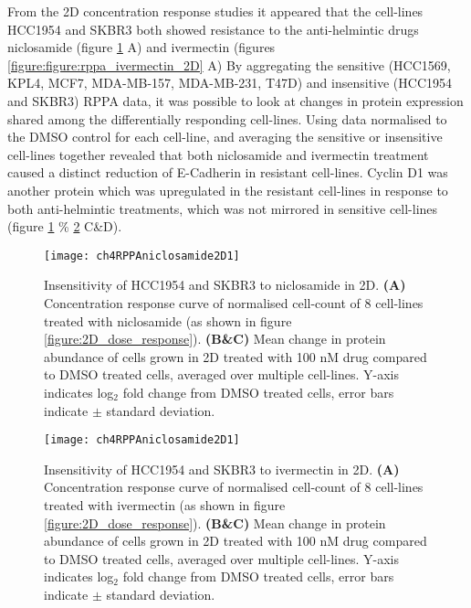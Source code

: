 \documentclass[a4paper,11pt,twoside,openright]{scrbook}
\begin{document}
From the 2D concentration response studies it appeared that the cell-lines HCC1954 and SKBR3 both showed resistance to 
the anti-helmintic drugs niclosamide (figure \ref{figure:rppa_niclosamide_2D1} A) and ivermectin (figures 
\ref{figure:figure:rppa_ivermectin_2D} A)
By aggregating the sensitive (HCC1569, KPL4, MCF7, MDA-MB-157, MDA-MB-231, T47D) and insensitive (HCC1954 and SKBR3) 
RPPA data, it was possible to look at changes in protein expression shared among the differentially responding 
cell-lines.
Using data normalised to the DMSO control for each cell-line, and averaging the sensitive or insensitive cell-lines 
together revealed that both niclosamide and ivermectin treatment caused a distinct reduction of E-Cadherin in resistant 
cell-lines.
Cyclin D1 was another protein which was upregulated in the resistant cell-lines in response to both anti-helmintic 
treatments, which was not mirrored in sensitive cell-lines (figure \ref{figure:rppa_niclosamide_2D1} \% 
\ref{figure:rppa_ivermectin_2D} C\&D).


\begin{figure}
    \captionsetup{width=0.8\textwidth}
    \caption[Insensitivity of HCC1954 and SKBR3 to niclosamide in 2D]{
        Insensitivity of HCC1954 and SKBR3 to niclosamide in 2D.
        \textbf{(A)} Concentration response curve of normalised cell-count of 8 cell-lines treated with niclosamide (as 
shown in figure \ref{figure:2D_dose_response}).
        \textbf{(B\&C)} Mean change in protein abundance of cells grown in 2D treated with 100 nM drug compared to DMSO 
treated cells, averaged over multiple cell-lines.
        Y-axis indicates log$_2$ fold change from DMSO treated cells, error bars indicate $\pm$ standard deviation.
        }
    \texttt{[image: ch4RPPAniclosamide2D1]}
    \label{figure:rppa_niclosamide_2D1}
\end{figure}

\begin{figure}
    \captionsetup{width=0.8\textwidth}
    \caption[Insensitivity of HCC1954 and SKBR3 to ivermectin in 2D]{
        Insensitivity of HCC1954 and SKBR3 to ivermectin in 2D.
        \textbf{(A)} Concentration response curve of normalised cell-count of 8 cell-lines treated with ivermectin (as 
shown in figure \ref{figure:2D_dose_response}).
        \textbf{(B\&C)} Mean change in protein abundance of cells grown in 2D treated with 100 nM drug compared to DMSO 
treated cells, averaged over multiple cell-lines.
        Y-axis indicates log$_2$ fold change from DMSO treated cells, error bars indicate $\pm$ standard deviation.
        }
    \texttt{[image: ch4RPPAniclosamide2D1]}
    \label{figure:rppa_ivermectin_2D}
\end{figure}
\end{document}
